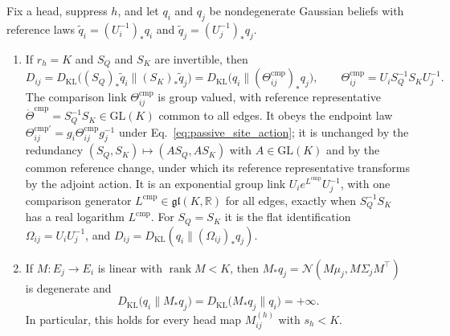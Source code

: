 \documentclass[twoside,11pt]{article}
\begin{document}
\begin{proposition}
\label{prop:comparison_link}
Fix a head, suppress \(h\), and let \(q_i\) and \(q_j\) be nondegenerate Gaussian beliefs with reference laws \(\widetilde q_i=(U_i^{-1})_*q_i\) and \(\widetilde q_j=(U_j^{-1})_*q_j\).
\begin{enumerate}
\item If \(r_h=K\) and \(S_Q\) and \(S_K\) are invertible, then
\begin{equation}
D_{ij}=D_{\mathrm{KL}}\bigl((S_Q)_*\widetilde q_i\|(S_K)_*\widetilde q_j\bigr)
=D_{\mathrm{KL}}\bigl(q_i\|(\Theta^{\mathrm{cmp}}_{ij})_*q_j\bigr),
\qquad
\Theta^{\mathrm{cmp}}_{ij}=U_iS_Q^{-1}S_KU_j^{-1}.
\label{eq:comparison_link}
\end{equation}
The comparison link \(\Theta^{\mathrm{cmp}}_{ij}\) is group valued, with reference representative \(\mathring\Theta^{\mathrm{cmp}}=S_Q^{-1}S_K\in\mathrm{GL}(K)\) common to all edges. It obeys the endpoint law \(\Theta^{\mathrm{cmp}\prime}_{ij}=g_i\Theta^{\mathrm{cmp}}_{ij}g_j^{-1}\) under Eq.~\eqref{eq:passive_site_action}; it is unchanged by the redundancy \((S_Q,S_K)\mapsto(AS_Q,AS_K)\) with \(A\in\mathrm{GL}(K)\) and by the common reference change, under which its reference representative transforms by the adjoint action. It is an exponential group link \(U_ie^{L^{\mathrm{cmp}}}U_j^{-1}\), with one comparison generator \(L^{\mathrm{cmp}}\in\mathfrak{gl}(K,\mathbb R)\) for all edges, exactly when \(S_Q^{-1}S_K\) has a real logarithm \(L^{\mathrm{cmp}}\). For \(S_Q=S_K\) it is the flat identification \(\Omega_{ij}=U_iU_j^{-1}\), and \(D_{ij}=D_{\mathrm{KL}}(q_i\|(\Omega_{ij})_*q_j)\).
\item If \(M:E_j\to E_i\) is linear with \(\operatorname{rank}M<K\), then \(M_*q_j=\mathcal N(M\mu_j,M\Sigma_jM^\top)\) is degenerate and
\begin{equation}
D_{\mathrm{KL}}\bigl(q_i\|M_*q_j\bigr)=D_{\mathrm{KL}}\bigl(M_*q_j\|q_i\bigr)=+\infty.
\label{eq:comparison_rank_obstruction}
\end{equation}
In particular, this holds for every head map \(M_{ij}^{(h)}\) with \(s_h<K\).
\end{enumerate}
\end{proposition}
\end{document}
